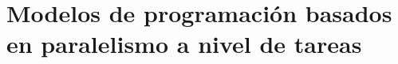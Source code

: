 \cleardoublepage


\chapter{Modelos de programación basados en paralelismo a nivel de tareas}
\label{ch:chapter3}

%
%
%
%



